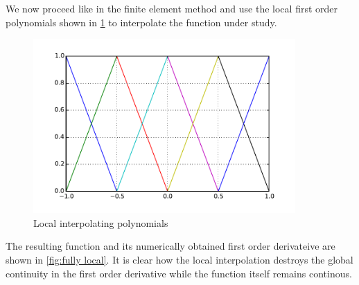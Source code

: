 We now proceed like in the finite element method and use the local first order polynomials shown in \cref{fig:loc-pols} to interpolate the function under study.

\begin{figure}[H]
  \centering
  \includegraphics[width=10cm]{localone.pdf}
  \caption{Local interpolating polynomials}
  \label{fig:loc-pols}
\end{figure}

The resulting function and its numerically obtained first order derivateive are shown in \cref{fig:fully local}. It is clear how the local interpolation destroys the global continuity in the first order derivative while the function itself remains continous.


